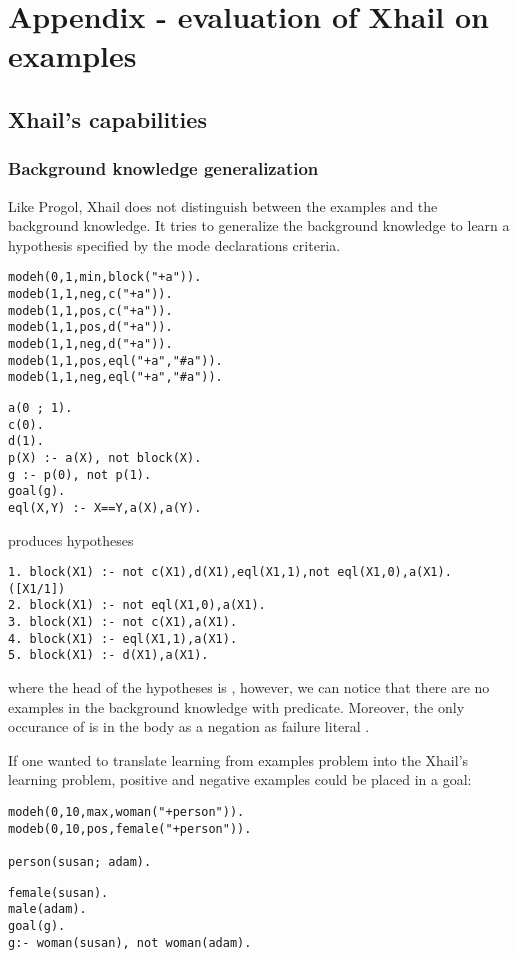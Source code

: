 \chapter{Appendix - evaluation of Xhail on examples}
\section{Xhail's capabilities}

\subsection{Background knowledge generalization}
Like Progol, Xhail does not distinguish between the examples and the background knowledge. It tries to generalize the background knowledge to learn a hypothesis specified by the mode declarations criteria.

\begin{minipage}[t]{.50\textwidth}
\begin{lstlisting}
modeh(0,1,min,block("+a")).
modeb(1,1,neg,c("+a")).
modeb(1,1,pos,c("+a")).
modeb(1,1,pos,d("+a")).
modeb(1,1,neg,d("+a")).
modeb(1,1,pos,eql("+a","#a")).
modeb(1,1,neg,eql("+a","#a")).
\end{lstlisting}
\end{minipage}
\begin{minipage}[t]{.20\textwidth}
\begin{lstlisting}
a(0 ; 1).
c(0).
d(1).
p(X) :- a(X), not block(X).
g :- p(0), not p(1).
goal(g).
eql(X,Y) :- X==Y,a(X),a(Y).
\end{lstlisting}
\end{minipage}

produces hypotheses
\begin{lstlisting}
1. block(X1) :- not c(X1),d(X1),eql(X1,1),not eql(X1,0),a(X1). ([X1/1])
2. block(X1) :- not eql(X1,0),a(X1).
3. block(X1) :- not c(X1),a(X1).
4. block(X1) :- eql(X1,1),a(X1).
5. block(X1) :- d(X1),a(X1).
\end{lstlisting}
where the head of the hypotheses is , however, we can notice that there are no examples in the background knowledge with  predicate. Moreover, the only occurance of  is in the body as a negation as failure literal .

If one wanted to translate learning from examples problem into the Xhail's learning problem, positive and negative examples could be placed in a goal:

\begin{minipage}[t]{.50\textwidth}
\begin{lstlisting}
modeh(0,10,max,woman("+person")).
modeb(0,10,pos,female("+person")).

person(susan; adam).
\end{lstlisting}
\end{minipage}
\begin{minipage}[t]{.20\textwidth}
\begin{lstlisting}
female(susan).
male(adam).
goal(g).
g:- woman(susan), not woman(adam).
\end{lstlisting}
\end{minipage}

